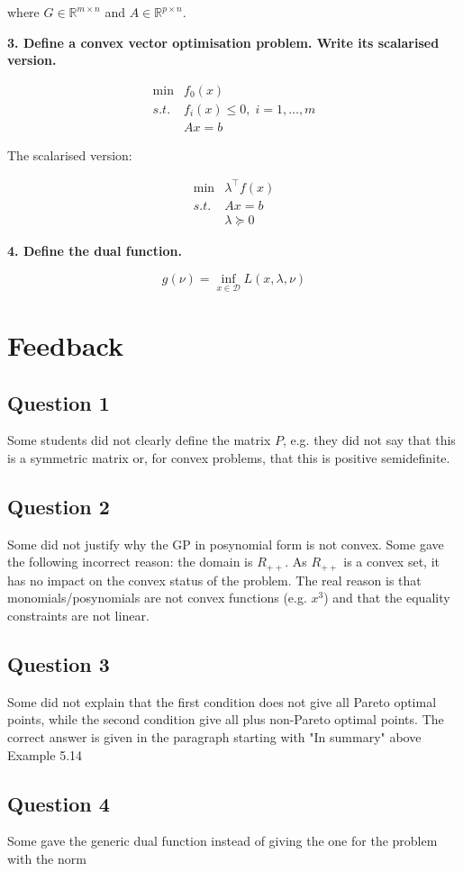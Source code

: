 where $G \in \mathbb{R}^{m\times n}$ and $A \in \mathbb{R}^{p\times n}$.

\noindent\textbf{3. \; Define a convex vector optimisation problem. Write its scalarised version.}

$$
\begin{array}{ll}
\min & f_0(x)\\
s.t. & f_i(x) \le 0, \; i = 1,\dots,m\\
& Ax = b
\end{array}
$$

The scalarised version:

$$
\begin{array}{ll}
\min & \lambda^\top f(x)\\
s.t. & Ax = b \\
& \lambda \succeq 0
\end{array}
$$

\noindent\textbf{4. \; Define the dual function.}

$$
g(\nu) = \inf_{x\in\mathcal{D}}  L(x,\lambda, \nu)
$$

\newpage

\section*{Feedback}

\subsection*{Question 1}
Some students did not clearly define the matrix $P$, e.g. they did not say that this is a symmetric matrix or, for convex problems, that this is positive semidefinite.

\subsection*{Question 2}
Some did not justify why the GP in posynomial form is not convex. Some gave the following incorrect reason: the domain is $R_{++}$. As $R_{++}$ is a convex set, it has no impact on the convex status of the problem. The real reason is that monomials/posynomials are not convex functions (e.g. $x^3$) and that the equality constraints are not linear.

\subsection*{Question 3}
Some did not explain that the first condition does not give all Pareto optimal points, while the second condition give all plus non-Pareto optimal points. The correct answer is given in the paragraph starting with "In summary" above Example 5.14

\subsection*{Question 4}
Some gave the generic dual function instead of giving the one for the problem with the norm